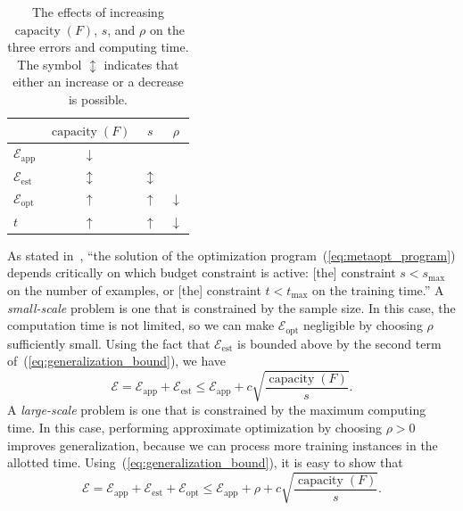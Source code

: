 \documentclass[11pt,a4paper]{article}
\numberwithin{equation}{section}
\newcommand{\capacity}{\operatorname{capacity}}
\newcommand{\apperr}{\mathcal{E}_{\mathrm{app}}}
\newcommand{\esterr}{\mathcal{E}_{\mathrm{est}}}
\newcommand{\opterr}{\mathcal{E}_{\mathrm{opt}}}
\begin{document}
\begin{table}
\centering
\begin{tabular}{lccc}
\toprule
& $\capacity(F)$ & $s$ & $\rho$ \\
\midrule
$\apperr$ & $\downarrow$ & \text{---} & \text{---} \\
$\esterr$ & $\updownarrow$ & $\updownarrow$ & \text{---} \\
$\opterr$ & $\uparrow$ & $\uparrow$ & $\downarrow$ \\
$t$ & $\uparrow$ & $\uparrow$ & $\downarrow$ \\
\bottomrule
\end{tabular}
\caption{The effects of increasing $\capacity(F)$, $s$, and $\rho$ on the three
errors and computing time. The symbol $\updownarrow$ indicates that either an
increase or a decrease is possible.\label{tab:metaopt_variables}}
\end{table}

As stated in~\citet{bousquet2008tradeoffs}, ``the solution of the optimization
program~(\ref{eq:metaopt_program}) depends critically on which budget constraint
is active: [the] constraint $s < s_{\text{max}}$ on the number of examples, or
[the] constraint $t < t_{\text{max}}$ on the training time.'' A
\emph{small-scale} problem is one that is constrained by the sample size. In
this case, the computation time is not limited, so we can make $\opterr$
negligible by choosing $\rho$ sufficiently small. Using the fact that $\esterr$
is bounded above by the second term of~(\ref{eq:generalization_bound}), we have
\begin{equation}
	\mathcal{E} = \apperr + \esterr \leq \apperr + c
		\sqrt{\frac{\capacity(F)}{s}}.
	\label{eq:small_scale_bound}
\end{equation}
A \emph{large-scale} problem is one that is constrained by the maximum computing
time. In this case, performing approximate optimization by choosing $\rho > 0$
improves generalization, because we can process more training instances in the
allotted time. Using~(\ref{eq:generalization_bound}), it is easy to show that
\begin{equation}
	\mathcal{E}
	= \apperr + \esterr + \opterr
	\leq \apperr + \rho + c\sqrt{\frac{\capacity(F)}{s}}.
	\label{eq:large_scale_bound}
\end{equation}
\end{document}
